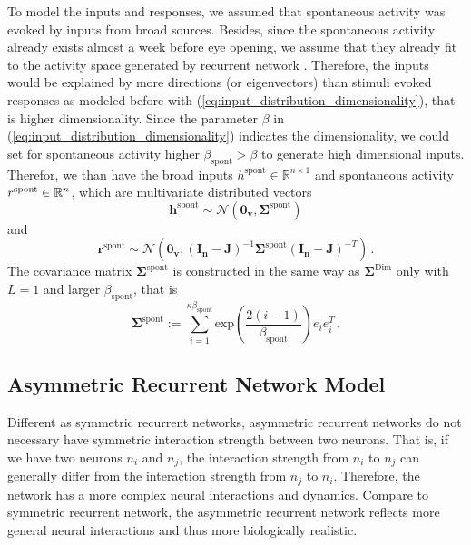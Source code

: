 \documentclass[11pt]{article}
\begin{document}
	To model the inputs and responses, we assumed that spontaneous activity was evoked by inputs from broad sources. Besides, since the spontaneous activity already exists almost a week before eye opening, we assume that they already fit to the activity space generated by recurrent network \cite{tragenap2023nature}. Therefore, the inputs would be explained by more directions (or eigenvectors) than stimuli evoked responses as modeled before with (\ref{eq:input_distribution_dimensionality}), that is higher dimensionality. Since the parameter $\beta$ in (\ref{eq:input_distribution_dimensionality}) indicates the dimensionality, we could set for spontaneous activity higher $\beta_{\text{spont}} > \beta$ to generate high dimensional inputs. 
	Therefor, we than have the broad inputs $h^{\text{spont}} \in \mathbb{R}^{n \times 1}$ and spontaneous activity $r^{\text{spont}} \in \mathbb{R}^{n \time 1}$, which are multivariate distributed vectors 
		\begin{equation}
			\mathbf{h}^{\text{spont}} \sim \mathbf{\mathcal{N}}(\mathbf{0_v}, \mathbf{\Sigma}^{\text{spont}})
		\end{equation}
	and 
		\begin{equation}
			\mathbf{r}^{\text{spont}} \sim \mathbf{\mathcal{N}}\left( \mathbf{0_v}, (\mathbf{I_n} - \mathbf{J})^{-1} \mathbf{\Sigma}^{\text{spont}}(\mathbf{I_n} - \mathbf{J})^{-T}\right) \, .
		\end{equation}
	The covariance matrix $\mathbf{\Sigma}^{\text{spont}}$ is constructed in the same way as $\mathbf{\Sigma}^{\text{Dim}}$ only with $L=1$ and larger $\beta_{\text{spont}}$, that is
		\begin{equation} \label{eq:Sigma_spont}
			\mathbf{\Sigma}^{\text{spont}} := \sum_{i=1}^{\kappa\beta_{\text{spont}}} \text{exp}\left(\frac{2(i-1)}{\beta_{\text{spont}}}\right) e_i e_i^T \, .
		\end{equation}
	
	\clearpage
	\subsection{Asymmetric Recurrent Network Model}
	Different as symmetric recurrent networks, asymmetric recurrent networks do not necessary have symmetric interaction strength between two neurons. That is, if we have two neurons $n_i$ and $n_j$, the interaction strength from $n_i$ to $n_j$ can generally differ from the interaction strength from $n_j$ to $n_i$. Therefore, the network has a more complex neural interactions and dynamics. Compare to symmetric recurrent network, the asymmetric recurrent network reflects more general neural interactions and thus more biologically realistic. 
	
\end{document}
